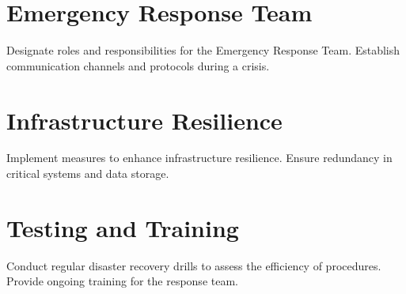 \section{Emergency Response Team}
Designate roles and responsibilities for the Emergency Response Team.
Establish communication channels and protocols during a crisis.

\section{Infrastructure Resilience}
Implement measures to enhance infrastructure resilience.
Ensure redundancy in critical systems and data storage.

\section{Testing and Training}
Conduct regular disaster recovery drills to assess the efficiency of procedures.
Provide ongoing training for the response team.